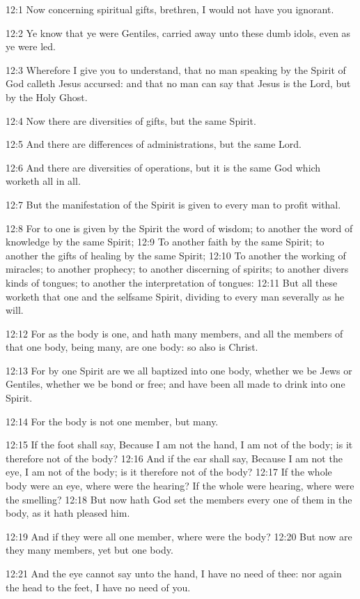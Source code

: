 12:1 Now concerning spiritual gifts, brethren, I would not have you
ignorant.

12:2 Ye know that ye were Gentiles, carried away unto these dumb
idols, even as ye were led.

12:3 Wherefore I give you to understand, that no man speaking by the
Spirit of God calleth Jesus accursed: and that no man can say that
Jesus is the Lord, but by the Holy Ghost.

12:4 Now there are diversities of gifts, but the same Spirit.

12:5 And there are differences of administrations, but the same Lord.

12:6 And there are diversities of operations, but it is the same God
which worketh all in all.

12:7 But the manifestation of the Spirit is given to every man to
profit withal.

12:8 For to one is given by the Spirit the word of wisdom; to another
the word of knowledge by the same Spirit; 12:9 To another faith by the
same Spirit; to another the gifts of healing by the same Spirit; 12:10
To another the working of miracles; to another prophecy; to another
discerning of spirits; to another divers kinds of tongues; to another
the interpretation of tongues: 12:11 But all these worketh that one
and the selfsame Spirit, dividing to every man severally as he will.

12:12 For as the body is one, and hath many members, and all the
members of that one body, being many, are one body: so also is Christ.

12:13 For by one Spirit are we all baptized into one body, whether we
be Jews or Gentiles, whether we be bond or free; and have been all
made to drink into one Spirit.

12:14 For the body is not one member, but many.

12:15 If the foot shall say, Because I am not the hand, I am not of
the body; is it therefore not of the body?  12:16 And if the ear shall
say, Because I am not the eye, I am not of the body; is it therefore
not of the body?  12:17 If the whole body were an eye, where were the
hearing? If the whole were hearing, where were the smelling?  12:18
But now hath God set the members every one of them in the body, as it
hath pleased him.

12:19 And if they were all one member, where were the body?  12:20 But
now are they many members, yet but one body.

12:21 And the eye cannot say unto the hand, I have no need of thee:
nor again the head to the feet, I have no need of you.

